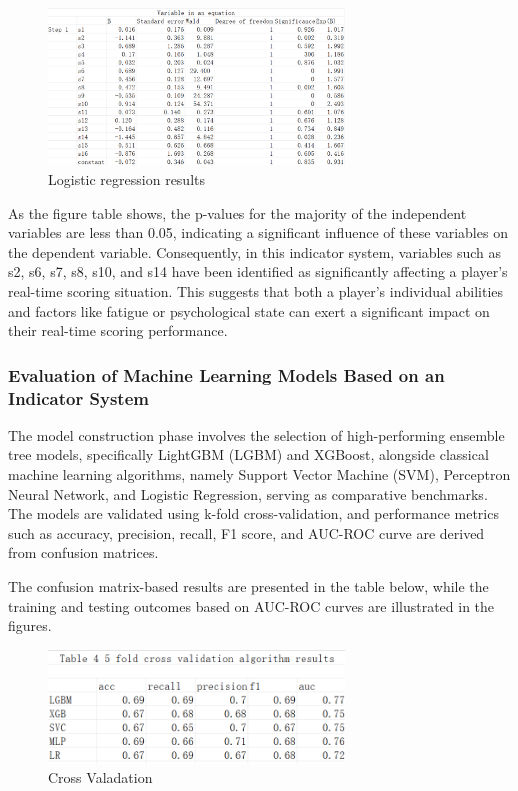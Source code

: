 \documentclass{article}
\begin{document}
\begin{figure}[H]
      \centering
      \includegraphics[width=0.7\textwidth]{variable_eq1.png}
      \caption{Logistic regression results}
\end{figure}
As the figure table shows, the p-values for the majority of the independent variables are less than 0.05, indicating a significant influence of these variables on the dependent variable. Consequently, in this indicator system, 
variables such as s2, s6, s7, s8, s10, and s14 have been identified as significantly affecting a player's real-time scoring situation. 
This suggests that both a player's individual abilities and factors like fatigue or psychological state can exert a significant impact on their real-time scoring performance.

\subsubsection{Evaluation of Machine Learning Models Based on an Indicator System}
The model construction phase involves the selection of high-performing ensemble tree models, specifically LightGBM (LGBM) and XGBoost, alongside classical machine learning algorithms, 
namely Support Vector Machine (SVM), Perceptron Neural Network, and Logistic Regression, serving as comparative benchmarks. The models are validated using k-fold cross-validation, 
and performance metrics such as accuracy, precision, recall, F1 score, and AUC-ROC curve are derived from confusion matrices.

The confusion matrix-based results are presented in the table below, while the training and testing outcomes based on AUC-ROC curves are illustrated in the figures.
\begin{figure}[H]
      \centering
      \includegraphics[width=0.7\textwidth]{cross_valadation.png}
      \caption{Cross Valadation}
\end{figure}
\end{document}
